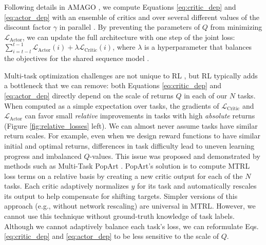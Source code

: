 Following details in AMAGO \cite{grigsby2024amago}, we compute Equations \eqref{eq:critic_dep} and \eqref{eq:actor_dep} with an ensemble of critics \cite{chen2021randomized} and over several different values of the discount factor $\gamma$ in parallel \cite{fedus2019hyperbolic}. By preventing the parameters of $Q$ from minimizing $\mathcal{L}_{\text{Actor}}$, we can update the full architecture with one step of the joint loss: $\sum_{i = t-l}^{t-1}\mathcal{L}_{\text{Actor}}(i) + \lambda \mathcal{L}_{\text{Critic}}(i)$, where $\lambda$ is a hyperparameter that balances the objectives for the shared sequence model \cite{ni2023transformers, grigsby2024amago}.


Multi-task optimization challenges are not unique to RL \cite{shaham2023causes, royer2024scalarization}, but RL typically adds a bottleneck that we can remove: both Equations \eqref{eq:critic_dep} and \eqref{eq:actor_dep} directly depend on the scale of returns $Q$ in each of our $N$ tasks. When computed as a simple expectation over tasks, the gradients of $\mathcal{L}_{\text{Critic}}$ and $\mathcal{L}_{\text{Actor}}$ can favor small \textit{relative} improvements in tasks with high \textit{absolute} returns (Figure \ref{fig:relative_losses} left). We can almost never assume tasks have similar return scales. For example, even when we design reward functions to have similar initial and optimal returns, differences in task difficulty lead to uneven learning progress and imbalanced $Q$-values. This issue was proposed and demonstrated by methods such as Multi-Task PopArt \cite{hessel2019multi}. PopArt's solution is to compute MTRL loss terms on a relative basis by creating a new critic output for each of the $N$ tasks. Each critic adaptively normalizes $y$ for its task and automatically rescales its output to help compensate for shifting targets. Simpler versions of this approach (e.g., without network rescaling) are universal in MTRL. However, we cannot use this technique without ground-truth knowledge of task labels. Although we cannot adaptively balance each task's loss, we can reformulate Eqs. \eqref{eq:critic_dep} and \eqref{eq:actor_dep} to be less sensitive to the scale of $Q$. 



